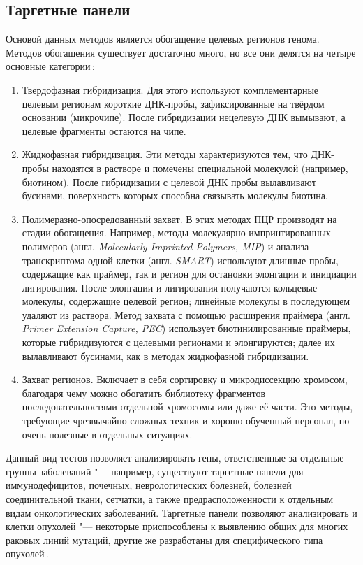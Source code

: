 \documentclass[12pt, twoside, a4paper]{article}
\newcommand{\engterm}[1]{англ. \textenglish{\textit{#1}}}
\begin{document}
\subsection*{Таргетные панели}

Основой данных методов является обогащение целевых регионов генома.
Методов обогащения существует достаточно много, но все они делятся на четыре основные категории\,\cite{Teer_2010}:

\begin{enumerate}
	\item Твердофазная гибридизация.
	      Для этого используют комплементарные целевым регионам короткие ДНК-пробы, зафиксированные на твёрдом основании (микрочипе).
	      После гибридизации нецелевую ДНК вымывают, а целевые фрагменты остаются на чипе.
	\item Жидкофазная гибридизация.
	      Эти методы характеризуются тем, что ДНК-пробы находятся в растворе и помечены специальной молекулой (например, биотином).
	      После гибридизации с целевой ДНК пробы вылавливают бусинами, поверхность которых способна связывать молекулы биотина.
	\item Полимеразно-опосредованный захват.
	      В этих методах ПЦР производят на стадии обогащения.
	      Например, методы молекулярно импринтированных полимеров (\engterm{Molecularly Imprinted Polymers, MIP}) и анализа транскриптома одной клетки (\engterm{SMART}) используют длинные пробы, содержащие как праймер, так и регион для остановки элонгации и инициации лигирования.
	      После элонгации и лигирования получаются кольцевые молекулы, содержащие целевой регион;
	      линейные молекулы в последующем удаляют из раствора.
	      Метод захвата с помощью расширения праймера (\engterm{Primer Extension Capture, PEC}) использует биотинилированные праймеры, которые гибридизуются с целевыми регионами и элонгируются;
	      далее их вылавливают бусинами, как в методах жидкофазной гибридизации.
	\item Захват регионов.
	      Включает в себя сортировку и микродиссекцию хромосом, благодаря чему можно обогатить библиотеку фрагментов последовательностями отдельной хромосомы или даже её части.
	      Это методы, требующие чрезвычайно сложных техник и хорошо обученный персонал, но очень полезные в отдельных ситуациях.
\end{enumerate}

Данный вид тестов позволяет анализировать гены, ответственные за отдельные группы заболеваний "--- например, существуют таргетные панели для иммунодефицитов, почечных, неврологических болезней, болезней соединительной ткани, сетчатки, а также предрасположенности к отдельным видам онкологических заболеваний.
Таргетные панели позволяют анализировать и клетки опухолей "--- некоторые приспособлены к выявлению общих для многих раковых линий мутаций, другие же разработаны для специфического типа опухолей\,\cite{Yohe_2017}.
\end{document}
